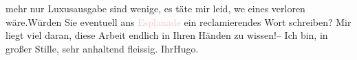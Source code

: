                mehr nur Luxusausgabe sind wenige, es täte mir leid, we{\geminationn} eines verloren wäre.\hspace*{1.5em}Würden Sie eventuell ans \textcolor{pink}{Esplanade}{}\ledrightnote{\textcolor{pink}{Hotel Esplanade}} ein reclamierendes Wort schreiben? Mir liegt viel daran, diese
               Arbeit endlich in Ihren Händen zu wissen!\hspace*{1.5em}– Ich bin,
               in großer Stille, sehr anhaltend fleissig.\pend
           \pstart Ihr\spacefill\mbox{Hugo.}\pend{}\endnumbering{}  
      